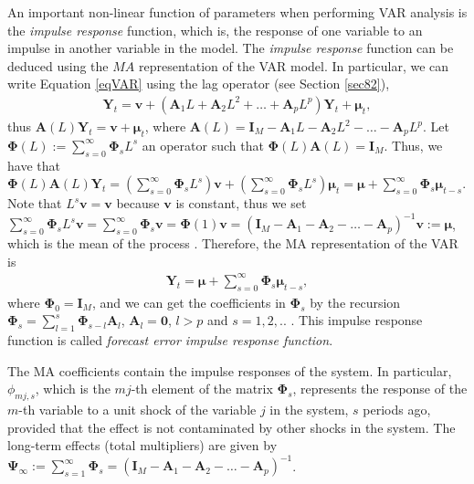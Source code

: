 An important non-linear function of parameters when performing VAR analysis is the \textit{impulse response} function, which is, the response of one variable to an impulse in another variable in the model. The \textit{impulse response} function can be deduced using the $MA$ representation of the VAR model. In particular, we can write Equation \ref{eqVAR} using the lag operator (see Section \ref{sec82}),
\begin{align}\label{eqVAR1}
	\bm{Y}_t=\bm{v} + (\bm{A}_{1}L+\bm{A}_{2}L^2+\dots+\bm{A}_{p}L^p)\bm{Y}_t+\bm{\mu}_t,
\end{align}
thus $\bm{A}(L)\bm{Y}_t=\bm{v}+\bm{\mu}_t$, where $\bm{A}(L)=\bm{I}_M-\bm{A}_{1}L-\bm{A}_{2}L^2-\dots-\bm{A}_{p}L^p$. Let $\bm{\Phi}(L):= \sum_{s=0}^{\infty}\bm{\Phi}_sL^s$ an operator such that $\bm{\Phi}(L)\bm{A}(L)=\bm{I}_M$. Thus, we have that  $\bm{\Phi}(L)\bm{A}(L)\bm{Y}_t=\left(\sum_{s=0}^{\infty}\bm{\Phi}_sL^s\right)\bm{v}+\left(\sum_{s=0}^{\infty}\bm{\Phi}_sL^s\right)\bm{\mu}_{t}=\bm{\mu}+\sum_{s=0}^{\infty}\bm{\Phi}_s\bm{\mu}_{t-s}$. Note that $L^s\bm{v}=\bm{v}$ because $\bm{v}$ is constant, thus we set $\sum_{s=0}^{\infty}\bm{\Phi}_sL^s\bm{v}=\sum_{s=0}^{\infty}\bm{\Phi}_s\bm{v}=\bm{\Phi}(1)\bm{v}=(\bm{I}_M-\bm{A}_{1}-\bm{A}_{2}-\dots-\bm{A}_{p})^{-1}\bm{v}:=\bm{\mu}$, which is the mean of the process \cite[Chap.~2]{helmut2005new}. Therefore, the MA representation of the VAR is
\begin{align}\label{eqMA}
	\bm{Y}_t=\bm{\mu} + \sum_{s=0}^{\infty}\bm{\Phi}_s\bm{\mu}_{t-s},
\end{align}
where $\bm{\Phi}_0=\bm{I}_M$, and we can get the coefficients in $\bm{\Phi}_s$ by the recursion $\bm{\Phi}_s=\sum_{l=1}^s\bm{\Phi}_{s-l}\bm{A}_l$, $\bm{A}_l=\bm{0}$, $l>p$ and $s=1,2,..$ \cite[Chap.~2]{helmut2005new}. This impulse response function is called \textit{forecast error impulse response function}.

The MA coefficients contain the impulse responses of the system. In particular, $\phi_{mj,s}$, which is the $mj$-th element of the matrix $\bm{\Phi}_s$, represents the response of the $m$-th variable to a unit shock of the variable $j$ in the system, $s$ periods ago, provided that the effect is not contaminated by other shocks in the system. The long-term effects (total multipliers) are given by $\bm{\Psi}_{\infty}:=\sum_{s=1}^{\infty}\bm{\Phi}_s=(\bm{I}_M-\bm{A}_{1}-\bm{A}_{2}-\dots-\bm{A}_{p})^{-1}$.

